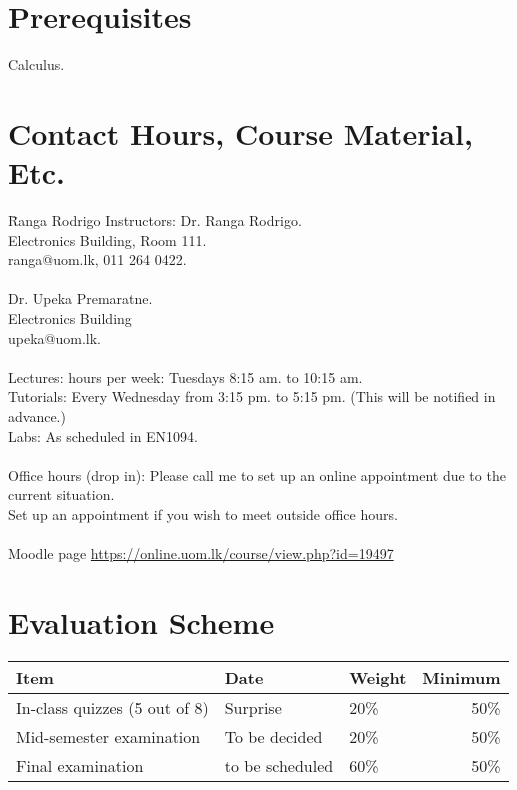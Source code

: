 \documentclass[11pt, a4paper]{article}
\begin{document}
\section{Prerequisites}
Calculus.


\section{Contact Hours, Course Material, Etc.}
\begin{tabbing}
  \hspace{2in}\= Ranga Rodrigo \kill
  Instructors: \>  Dr. Ranga Rodrigo.\\
  \> Electronics Building, Room 111.\\
                \> ranga@uom.lk, 011 264 0422.\\
                \\
                 \>  Dr. Upeka Premaratne.\\
  \> Electronics Building\\
                \> upeka@uom.lk.\\
                \\
  Lectures:  hours per week: Tuesdays 8:15 am. to 10:15 am.\\
  Tutorials: \> Every Wednesday from 3:15 pm. to 5:15 pm. (This will be notified in advance.)\\
  Labs: \> As scheduled in EN1094.\\
  \\
  Office hours (drop in): \> Please call me to set up an online appointment due to the current situation.\\
  \> Set up an appointment if you wish to meet outside office hours.\\
  \\
  Moodle page \>
  \href{https://online.uom.lk/course/view.php?id=19497}{https://online.uom.lk/course/view.php?id=19497}

\end{tabbing}

\section{Evaluation Scheme}
\noindent
\begin{tabular}{@{}lllr@{}}
  \toprule
  Item   & Date& Weight& Minimum\\
  \midrule
  In-class quizzes (5 out of 8) & Surprise & 20\% & 50\%\\

  Mid-semester examination  &  To be decided& 20\% & 50\%\\

  Final examination & to be scheduled & 60\% & 50\%\\
  \bottomrule
\end{tabular}
\end{document}
